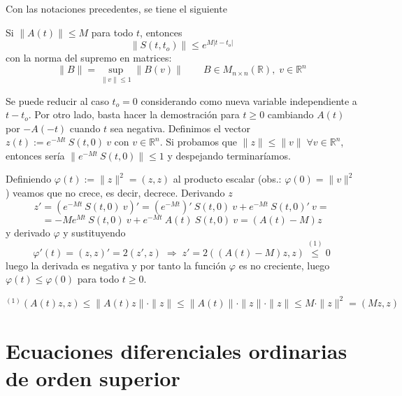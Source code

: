              Con las notaciones precedentes, se tiene el siguiente
\begin{lem} 
    Si $\|A(t)\| \leq M$ para todo $t$, entonces \label{lema4.4}
    $$\|S(t,t_o)\| \leq e^{M|t-t_o|}$$
    con la norma del supremo en matrices:
    $$\|B\|=\sup_{\|v\|\leq 1}\|B(v)\| \qquad B \in M_{n \times n}(\mathbb R) , \; v \in \mathbb R^n $$
    \end{lem}
\begin{dem}
Se puede reducir al caso $t_o=0$ considerando como nueva variable independiente a $t - t_o$. Por otro lado, basta hacer la demostración para $t \geq 0$ cambiando $A(t)$ por $-A(-t)$ cuando $t$ sea negativa. Definimos el vector $z(t):=e^{-Mt} \: S(t,0) \: v$ con $v \in \mathbb R^n$. Si probamos que $\|z\| \leq \|v\| \; \forall v \in \mathbb R^n$, entonces sería $\|e^{-Mt} \: S(t,0) \| \leq 1$ y despejando terminaríamos.

Definiendo $\varphi(t):=\|z\|^{2}=(z,z)$ al producto escalar (obs.: $\varphi(0)=\|v\|^2$) veamos que no crece, es decir, decrece. Derivando $z$
$$z'=(e^{-Mt} \: S(t,0) \: v)'=(e^{-Mt})' \: S(t,0) \: v + e^{-Mt} \: S(t,0)' \: v= $$ 
$$= -Me^{Mt} \: S(t,0) \: v + e^{-Mt} \: A(t) \: S(t,0) \: v = (A(t)-M) z$$
y derivado $\varphi$ y sustituyendo
$$\varphi'(t)=(z,z)'=2(z',z) \; \Rightarrow \; z'=2((A(t)-M)z,z) \overset{(1)}{\leq} 0$$
luego la derivada es negativa y por tanto la función $\varphi$ es no creciente, luego $\varphi(t) \leq \varphi(0)$ para todo $t \geq 0$.

$^{(1)} (A(t)z,z) \leq \|A(t)z\|\cdot \|z\| \leq \|A(t)\|\cdot \|z\|\cdot \|z\| \leq M \cdot \|z\|^2 = (Mz,z)$
     \end{dem}

\chapter{Ecuaciones diferenciales ordinarias de orden superior}

